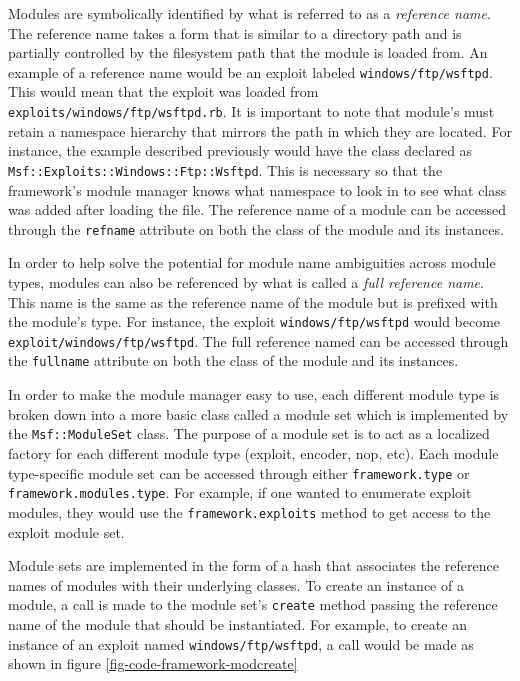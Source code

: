 \documentclass{report}
\begin{document}
\par
Modules are symbolically identified by what is referred to as a
\textit{reference name}.  The reference name takes a form that is
similar to a directory path and is partially controlled by the
filesystem path that the module is loaded from.  An example of a
reference name would be an exploit labeled
\texttt{windows/ftp/wsftpd}.  This would mean that the exploit was
loaded from \texttt{exploits/windows/ftp/wsftpd.rb}.  It is
important to note that module's must retain a namespace hierarchy
that mirrors the path in which they are located.  For instance, the
example described previously would have the class declared as
\texttt{Msf::Exploits::Windows::Ftp::Wsftpd}.  This is necessary so
that the framework's module manager knows what namespace to look in
to see what class was added after loading the file.  The reference
name of a module can be accessed through the \texttt{refname}
attribute on both the class of the module and its instances.

\par
In order to help solve the potential for module name ambiguities
across module types, modules can also be referenced by what is
called a \textit{full reference name}.  This name is the same as the
reference name of the module but is prefixed with the module's type.
For instance, the exploit \texttt{windows/ftp/wsftpd} would become
\texttt{exploit/windows/ftp/wsftpd}.  The full reference named can
be accessed through the \texttt{fullname} attribute on both the
class of the module and its instances.

\par
In order to make the module manager easy to use, each different
module type is broken down into a more basic class called a module
set which is implemented by the \texttt{Msf::ModuleSet} class.  The
purpose of a module set is to act as a localized factory for each
different module type (exploit, encoder, nop, etc).  Each module
type-specific module set can be accessed through either
\texttt{framework.type} or \texttt{framework.modules.type}.  For
example, if one wanted to enumerate exploit modules, they would use
the \texttt{framework.exploits} method to get access to the exploit
module set.

\par
Module sets are implemented in the form of a hash that associates
the reference names of modules with their underlying classes.  To
create an instance of a module, a call is made to the module set's
\texttt{create} method passing the reference name of the module that
should be instantiated.  For example, to create an instance of an
exploit named \texttt{windows/ftp/wsftpd}, a call would be made as
shown in figure \ref{fig-code-framework-modcreate}
\end{document}

